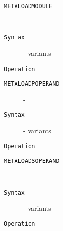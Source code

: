 \clearpage
\begin{description}
\item[\texttt{METALOADMODULE}]  - \\
\item[\texttt{Syntax}] - variants\\

\item[\texttt{Operation}]
\item[\texttt{}]
\end{description}
\clearpage
\begin{description}
\item[\texttt{METALOADPOPERAND}]  - \\
\item[\texttt{Syntax}] - variants\\

\item[\texttt{Operation}]
\item[\texttt{}]
\end{description}
\clearpage
\begin{description}
\item[\texttt{METALOADSOPERAND}]  - \\
\item[\texttt{Syntax}] - variants\\

\item[\texttt{Operation}]
\item[\texttt{}]
\end{description}
\clearpage
